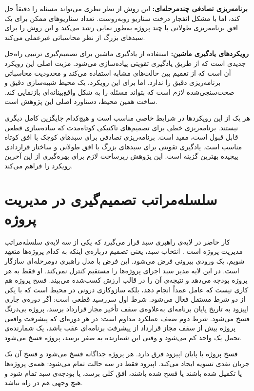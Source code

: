 \textbf{برنامه‌ریزی تصادفی چندمرحله‌ای:} این روش از نظر نظری
می‌تواند مسئله را دقیقاً حل کند، اما با مشکل انفجار درخت سناریو
روبه‌روست. تعداد سناریوهای ممکن برای یک افق برنامه‌ریزی طولانی
با چند پروژه به‌طور نمایی رشد می‌کند و این روش را برای
سبدهای بزرگ از نظر محاسباتی غیرعملی می‌کند.

\textbf{رویکردهای یادگیری ماشین:} استفاده از یادگیری ماشین برای
تصمیم‌گیری ترتیبی راه‌حل جدیدی است که از طریق یادگیری تقویتی
پیاده‌سازی می‌شود. مزیت اصلی این رویکرد آن است که از تعمیم
بین حالت‌های مشابه استفاده می‌کند و محدودیت محاسباتی
برنامه‌ریزی دقیق را ندارد. اما برای این رویکرد، یک محیط
شبیه‌سازی دقیق و صحت‌سنجی‌شده لازم است که بتواند مسئله را به
شکل واقع‌بینانه‌ای بازنمایی کند. ساخت همین محیط، دستاورد
اصلی این پژوهش است.

هر یک از این رویکردها در شرایط خاصی مناسب است و هیچ‌کدام
جایگزین کامل دیگری نیستند. برنامه‌ریزی خطی برای تصمیم‌های
تاکتیکی کوتاه‌مدت که ساده‌سازی قطعی قابل قبول است، مفید است.
برنامه‌ریزی تصادفی برای سبدهای کوچک با افق کوتاه مناسب است.
یادگیری تقویتی برای سبدهای بزرگ با افق طولانی و ساختار
قراردادی پیچیده بهترین گزینه است. این پژوهش زیرساخت لازم برای
بهره‌گیری از این آخرین رویکرد را فراهم می‌کند.

\section{سلسله‌مراتب تصمیم‌گیری در مدیریت پروژه}
\label{sec:hierarchy}

کار حاضر در لایه‌ی راهبری سبد قرار می‌گیرد که یکی از سه لایه‌ی
سلسله‌مراتب مدیریت پروژه است \citep{PMI2017}.
انتخاب سبد، یعنی تصمیم درباره‌ی اینکه به کدام پروژه‌ها متعهد شویم،
یک ورودی بیرونی فرض می‌شود. این فرض با مدل راهبری دومرحله‌ای
\citep{Turner2014} سازگار است.
در این لایه مدیر سبد اجرای پروژه‌ها را مستقیم کنترل نمی‌کند.
او فقط به هر پروژه بودجه می‌دهد و نتیجه‌ی آن را در قالب ارزش
کسب‌شده می‌بیند.
فسخ پروژه هم کاری نیست که عامل عمداً انجام دهد، بلکه سازوکاری
درونی در محیط است که با یکی از دو شرط مستقل فعال می‌شود.
شرط اول سررسید قطعی است: اگر دوره‌ی جاری اپیزود به تاریخ پایان
برنامه‌ای به‌علاوه‌ی سقف تأخیر مجاز قرارداد برسد، پروژه بی‌درنگ
فسخ می‌شود.
شرط دوم ضعف عملکرد مداوم است: در هر دوره‌ای که پیشرفت واقعی پروژه
بیش از سقف مجاز قرارداد از پیشرفت برنامه‌ای عقب باشد، یک
شمارنده‌ی تحمل یک واحد کم می‌شود و وقتی این شمارنده به صفر برسد،
پروژه فسخ می‌شود.

فسخ پروژه با پایان اپیزود فرق دارد.
هر پروژه جداگانه فسخ می‌شود و فسخ آن یک جریان نقدی تسویه ایجاد
می‌کند. اپیزود فقط در سه حالت تمام می‌شود: همه‌ی پروژه‌ها یا
تکمیل شده باشند یا فسخ شده باشند، افق کلی برسد، یا بودجه‌ی سبد
تمام شود و هیچ وجهی هم در راه نباشد.

